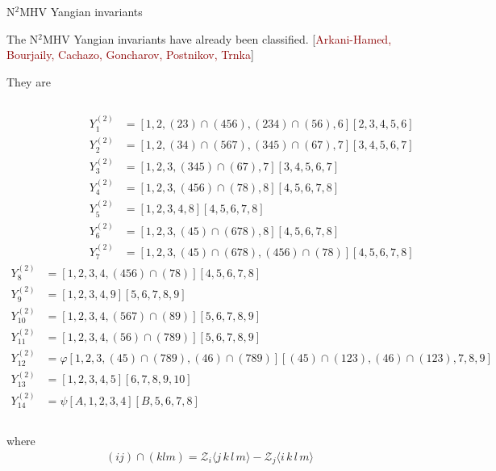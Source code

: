 \documentclass[10pt]{beamer}
\begin{document}
\begin{frame}[t]{N$^{2}$MHV Yangian invariants}


The N$^{2}$MHV Yangian invariants have already been classified. {\footnotesize[\textcolor{darkred}{Arkani-Hamed, Bourjaily, Cachazo, Goncharov, Postnikov, Trnka}]}

They are 
\begin{columns}
  \tiny
  \begin{align*}
    Y^{(2)}_1 &= [1,2,(23)\cap (456), (234) \cap (56) , 6] [2,3,4,5,6] \\
    \nonumber
    Y^{(2)}_2 &= [1,2,(34) \cap (567), (345) \cap (67), 7] [3,4,5,6,7] \\
    \nonumber
    Y^{(2)}_3 &= [1,2,3,(345) \cap (67), 7] [3,4,5,6,7] \\
    \nonumber
    Y^{(2)}_4 &= [1,2,3,(456) \cap (78), 8] [4,5,6,7,8] \\
    \nonumber
    Y^{(2)}_5 &= [1,2,3,4,8] [4,5,6,7,8] \\
    \nonumber
    Y^{(2)}_6 &= [1,2,3,(45) \cap (678), 8] [4,5,6,7,8] \\
    Y^{(2)}_7 &= [1,2,3,(45) \cap (678), (456) \cap (78)] [4,5,6,7,8]
  \end{align*}
  \tiny
  \begin{align*}
    Y^{(2)}_8 &= [1,2,3,4,(456) \cap (78)] [4,5,6,7,8] \\
    \nonumber
    Y^{(2)}_9 &= [1,2,3,4,9] [5,6,7,8,9] \\
    \nonumber
    Y^{(2)}_{10}&=[1,2,3,4,(567) \cap (89)] [5,6,7,8,9] \\
    \nonumber
    Y^{(2)}_{11}&=[1,2,3,4,(56) \cap (789)] [5,6,7,8,9] \\
    \nonumber
    Y^{(2)}_{12}&= \varphi 
    [1,2,3,(45) \cap (789) , (46) \cap (789)] [(45) \cap (123), (46) \cap (123), 7,8,9] \\
    Y^{(2)}_{13}&=[1,2,3,4,5][6,7,8,9,10] \\
    Y^{(2)}_{14}&=\psi [A,1,2,3,4][B,5,6,7,8]
    \nonumber
  \end{align*}
\end{columns}
  where
  \begin{align*}
  (i j) \cap (k l m ) = \mathcal{Z}_i \langle j\, k\, l\, m \rangle - \mathcal{Z}_j \langle i\, k \, l\, m \rangle
  \end{align*}

\end{frame}
\end{document}
